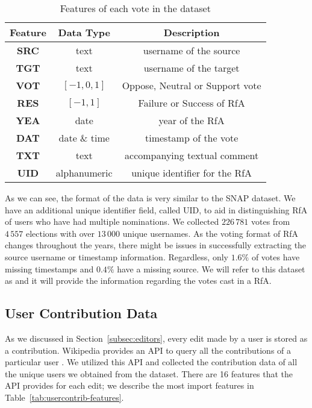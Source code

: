 \begin{table}[htp]
    \centering
    \caption{Features of each vote in the \wikirfa dataset}
    \label{tab:wiki-rfa-features}
    \begin{tabular}{ccc}
        \toprule
        Feature & Data Type & Description\\
        \midrule
        \textbf{SRC}&text & username of the source\\
        \textbf{TGT}&text & username of the target\\
        \textbf{VOT}&$[-1,0,1]$& Oppose, Neutral or Support vote\\
        \textbf{RES}&$[-1,1]$ & Failure or Success of RfA\\
        \textbf{YEA}&date & year of the RfA\\
        \textbf{DAT}& date \& time & timestamp of the vote\\
        \textbf{TXT}&text &accompanying textual comment \\
        \textbf{UID}&alphanumeric&  unique identifier for the RfA\\
        \bottomrule
    \end{tabular}
\end{table}
As we can see, the format of the data is very similar to the SNAP dataset.
We have an additional unique identifier field, called UID, to aid in distinguishing RfA of users who have had multiple nominations.
We collected $226\,781$ votes from $4\,557$ elections with over $13\,000$ unique usernames.
As the voting format of RfA changes throughout the years, there might be issues in successfully extracting the source username or timestamp information. 
Regardless, only $1.6\%$ of votes have missing timestamps and $0.4\%$ have a missing source.
We will refer to this dataset as \wikirfa and it will provide the information regarding the votes cast in a RfA.

\subsection{User Contribution Data}
As we discussed in Section~\ref{subsec:editors}, every edit made by a user is stored as a contribution.
Wikipedia provides an API to query all the contributions of a particular user \cite{wiki:Usercontribs-api}.  
We utilized this API and collected the contribution data of all the unique users we obtained from the \wikirfa dataset.
There are 16 features that the API provides for each edit; we describe the most import features in Table~\ref{tab:usercontrib-features}.


